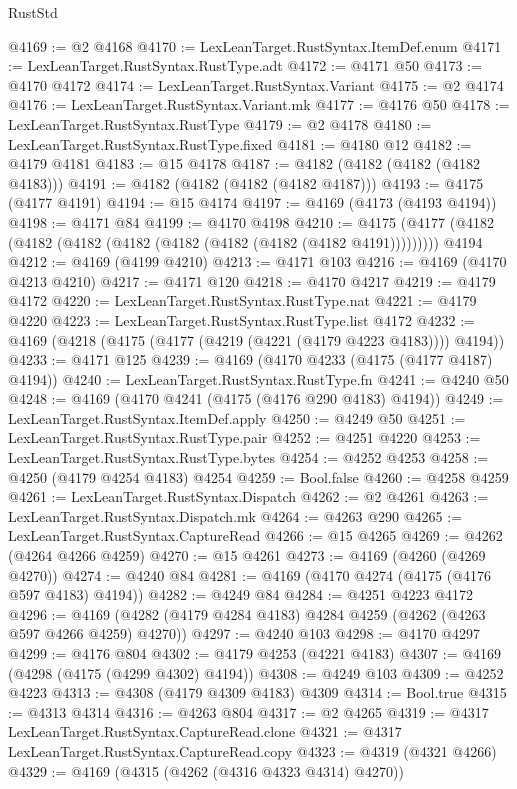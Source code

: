 \begin{lexlean}{RustStd}
\begin{coremodule}
@4169 := @2 @4168
@4170 := LexLeanTarget.RustSyntax.ItemDef.enum
@4171 := LexLeanTarget.RustSyntax.RustType.adt
@4172 := @4171 @50
@4173 := @4170 @4172
@4174 := LexLeanTarget.RustSyntax.Variant
@4175 := @2 @4174
@4176 := LexLeanTarget.RustSyntax.Variant.mk
@4177 := @4176 @50
@4178 := LexLeanTarget.RustSyntax.RustType
@4179 := @2 @4178
@4180 := LexLeanTarget.RustSyntax.RustType.fixed
@4181 := @4180 @12
@4182 := @4179 @4181
@4183 := @15 @4178
@4187 := @4182 (@4182 (@4182 (@4182 @4183)))
@4191 := @4182 (@4182 (@4182 (@4182 @4187)))
@4193 := @4175 (@4177 @4191)
@4194 := @15 @4174
@4197 := @4169 (@4173 (@4193 @4194))
@4198 := @4171 @84
@4199 := @4170 @4198
@4210 := @4175 (@4177 (@4182 (@4182 (@4182 (@4182 (@4182 (@4182 (@4182 (@4182 @4191))))))))) @4194
@4212 := @4169 (@4199 @4210)
@4213 := @4171 @103
@4216 := @4169 (@4170 @4213 @4210)
@4217 := @4171 @120
@4218 := @4170 @4217
@4219 := @4179 @4172
@4220 := LexLeanTarget.RustSyntax.RustType.nat
@4221 := @4179 @4220
@4223 := LexLeanTarget.RustSyntax.RustType.list @4172
@4232 := @4169 (@4218 (@4175 (@4177 (@4219 (@4221 (@4179 @4223 @4183)))) @4194))
@4233 := @4171 @125
@4239 := @4169 (@4170 @4233 (@4175 (@4177 @4187) @4194))
@4240 := LexLeanTarget.RustSyntax.RustType.fn
@4241 := @4240 @50
@4248 := @4169 (@4170 @4241 (@4175 (@4176 @290 @4183) @4194))
@4249 := LexLeanTarget.RustSyntax.ItemDef.apply
@4250 := @4249 @50
@4251 := LexLeanTarget.RustSyntax.RustType.pair
@4252 := @4251 @4220
@4253 := LexLeanTarget.RustSyntax.RustType.bytes
@4254 := @4252 @4253
@4258 := @4250 (@4179 @4254 @4183) @4254
@4259 := Bool.false
@4260 := @4258 @4259
@4261 := LexLeanTarget.RustSyntax.Dispatch
@4262 := @2 @4261
@4263 := LexLeanTarget.RustSyntax.Dispatch.mk
@4264 := @4263 @290
@4265 := LexLeanTarget.RustSyntax.CaptureRead
@4266 := @15 @4265
@4269 := @4262 (@4264 @4266 @4259)
@4270 := @15 @4261
@4273 := @4169 (@4260 (@4269 @4270))
@4274 := @4240 @84
@4281 := @4169 (@4170 @4274 (@4175 (@4176 @597 @4183) @4194))
@4282 := @4249 @84
@4284 := @4251 @4223 @4172
@4296 := @4169 (@4282 (@4179 @4284 @4183) @4284 @4259 (@4262 (@4263 @597 @4266 @4259) @4270))
@4297 := @4240 @103
@4298 := @4170 @4297
@4299 := @4176 @804
@4302 := @4179 @4253 (@4221 @4183)
@4307 := @4169 (@4298 (@4175 (@4299 @4302) @4194))
@4308 := @4249 @103
@4309 := @4252 @4223
@4313 := @4308 (@4179 @4309 @4183) @4309
@4314 := Bool.true
@4315 := @4313 @4314
@4316 := @4263 @804
@4317 := @2 @4265
@4319 := @4317 LexLeanTarget.RustSyntax.CaptureRead.clone
@4321 := @4317 LexLeanTarget.RustSyntax.CaptureRead.copy
@4323 := @4319 (@4321 @4266)
@4329 := @4169 (@4315 (@4262 (@4316 @4323 @4314) @4270))

\end{coremodule}
\end{lexlean}
